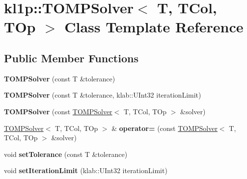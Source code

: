 \hypertarget{classkl1p_1_1TOMPSolver}{}\section{kl1p\+:\+:T\+O\+M\+P\+Solver$<$ T, T\+Col, T\+Op $>$ Class Template Reference}
\label{classkl1p_1_1TOMPSolver}
\subsection*{Public Member Functions}
\begin{DoxyCompactItemize}
\item 
{\bfseries T\+O\+M\+P\+Solver} (const T \&tolerance)\hypertarget{classkl1p_1_1TOMPSolver_a98d2181903f1deded73b80b594179a6d}{}\label{classkl1p_1_1TOMPSolver_a98d2181903f1deded73b80b594179a6d}

\item 
{\bfseries T\+O\+M\+P\+Solver} (const T \&tolerance, klab\+::\+U\+Int32 iteration\+Limit)\hypertarget{classkl1p_1_1TOMPSolver_ac60c1daa56608ded50583189b636fe22}{}\label{classkl1p_1_1TOMPSolver_ac60c1daa56608ded50583189b636fe22}

\item 
{\bfseries T\+O\+M\+P\+Solver} (const \hyperlink{classkl1p_1_1TOMPSolver}{T\+O\+M\+P\+Solver}$<$ T, T\+Col, T\+Op $>$ \&solver)\hypertarget{classkl1p_1_1TOMPSolver_acfc8eca52f95157d4a438ff3d6072130}{}\label{classkl1p_1_1TOMPSolver_acfc8eca52f95157d4a438ff3d6072130}

\item 
\hyperlink{classkl1p_1_1TOMPSolver}{T\+O\+M\+P\+Solver}$<$ T, T\+Col, T\+Op $>$ \& {\bfseries operator=} (const \hyperlink{classkl1p_1_1TOMPSolver}{T\+O\+M\+P\+Solver}$<$ T, T\+Col, T\+Op $>$ \&solver)\hypertarget{classkl1p_1_1TOMPSolver_a37d3d7041331a1ddb429777eb4f3dbdf}{}\label{classkl1p_1_1TOMPSolver_a37d3d7041331a1ddb429777eb4f3dbdf}

\item 
void {\bfseries set\+Tolerance} (const T \&tolerance)\hypertarget{classkl1p_1_1TOMPSolver_aa9d3d1cca62b69d7c2363f3408afa04f}{}\label{classkl1p_1_1TOMPSolver_aa9d3d1cca62b69d7c2363f3408afa04f}

\item 
void {\bfseries set\+Iteration\+Limit} (klab\+::\+U\+Int32 iteration\+Limit)\hypertarget{classkl1p_1_1TOMPSolver_a6f3207b7d07df6abe98b886c85a97f2b}{}\label{classkl1p_1_1TOMPSolver_a6f3207b7d07df6abe98b886c85a97f2b}


\end{DoxyCompactItemize}
